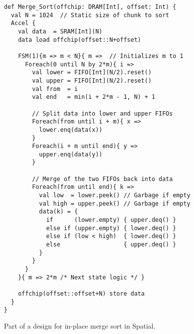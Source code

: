 \begin{figure}
\centering
\newsavebox{\sortMerge}
\begin{lrbox}{\sortMerge}
\begin{lstlisting}[language=Spatial,linewidth=0.7\columnwidth]
def Merge_Sort(offchip: DRAM[Int], offset: Int) {
  val N = 1024  // Static size of chunk to sort
  Accel {
    val data  = SRAM[Int](N)
    data load offchip(offset::N+offset)

    FSM(1){m => m < N}{ m =>  // Initializes m to 1
      Foreach(0 until N by 2*m){ i =>
        val lower = FIFO[Int](N/2).reset()
        val upper = FIFO[Int](N/2).reset()
        val from  = i
        val end   = min(i + 2*m - 1, N) + 1

        // Split data into lower and upper FIFOs
        Foreach(from until i + m){ x =>
          lower.enq(data(x))
        }
        Foreach(i + m until end){ y =>
          upper.enq(data(y))
        }

        // Merge of the two FIFOs back into data
        Foreach(from until end){ k =>
          val low  = lower.peek() // Garbage if empty
          val high = upper.peek() // Garbage if empty
          data(k) = {
            if      (lower.empty) { upper.deq() }
            else if (upper.empty) { lower.deq() }
            else if (low < high)  { lower.deq() }
            else                  { upper.deq() }
          }
        }
      }
    }{ m => 2*m /* Next state logic */ }

    offchip(offset::offset+N) store data
  }
}
\end{lstlisting}
\end{lrbox}

\hspace{-75pt}\usebox{\sortMerge}
\caption{Part of a design for in-place merge sort in Spatial.}
\label{fig:sortMerge}
\end{figure}
